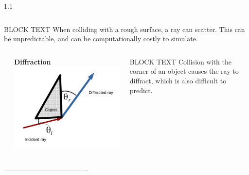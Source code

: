 \documentclass[final]{beamer}
\theoremstyle{plain}
\theoremstyle{definition}
\theoremstyle{remark}
\newlength{\threecolwid}
\begin{document}
\begin{frame}[t]
\begin{columns}[t]
\begin{column}{1.1\threecolwid}
\begin{mdframed}[backgroundcolor=jblue!15, linecolor=jblue!70,
  linewidth=20pt,
  topline=true,
  rightline=true,
  leftline=true, bottomline=true, userdefinedwidth=0.999999999999999\linewidth]
\begin{columns}
\begin{column}{0.52\linewidth}
 \vspace{0.5cm}
 \par
 BLOCK TEXT
When colliding with a rough surface, a ray can scatter. This can be unpredictable, and can be computationally costly to simulate. \cite{Antennas2007}
 \end{column}
 \end{columns}
 \vspace{1cm}
 \begin{columns}
 \begin{column}{0.01\linewidth}
  \end{column}
\begin{column}{0.445\linewidth}
\textbf{Diffraction
} \\
\includegraphics[scale=0.53]{Diffraction.jpg}
\end{column}
\begin{column}{0.53\linewidth}
BLOCK TEXT 
Collision with the corner of an object causes the ray to diffract, which is also difficult to predict.
\end{column}
\end{columns}
\end{mdframed}



-------------------------------------


\end{column}
\end{columns}
\end{frame}
\end{document}
